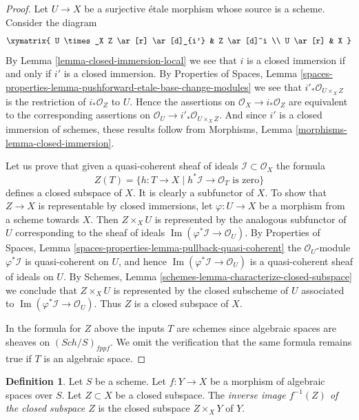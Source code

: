 \documentclass{stacks-project}
\theoremstyle{plain}
\theoremstyle{definition}
\newtheorem{definition}[subsection]{Definition}
\theoremstyle{remark}
\numberwithin{equation}{subsection}
\def\Sch{\mathit{Sch}}
\def\Im{\mathop{\mathrm{Im}}}
\begin{document}
\begin{proof}
Let $U \to X$ be a surjective \'etale morphism whose source is a scheme.
Consider the diagram
$$
\xymatrix{
U \times_X Z \ar[r] \ar[d]_{i'} & Z \ar[d]^i \\
U \ar[r] & X
}
$$
By
Lemma \ref{lemma-closed-immersion-local}
we see that $i$ is a closed immersion
if and only if $i'$ is a closed immersion. By
Properties of Spaces,
Lemma \ref{spaces-properties-lemma-pushforward-etale-base-change-modules}
we see that $i'_*\mathcal{O}_{U \times_X Z}$ is the restriction of
$i_*\mathcal{O}_Z$ to $U$. Hence the assertions on
$\mathcal{O}_X \to i_*\mathcal{O}_Z$ are equivalent to the
corresponding assertions on
$\mathcal{O}_U \to i'_*\mathcal{O}_{U \times_X Z}$.
And since $i'$ is a closed immersion of schemes, these results follow from
Morphisms, Lemma \ref{morphisms-lemma-closed-immersion}.

\medskip\noindent
Let us prove that given a quasi-coherent
sheaf of ideals $\mathcal{I} \subset \mathcal{O}_X$ the formula
$$
Z(T) = \{h : T \to X \mid h^*\mathcal{I} \to \mathcal{O}_T
\text{ is zero}\}
$$
defines a closed subspace of $X$. It is clearly a subfunctor of $X$.
To show that $Z \to X$ is representable by closed immersions, let
$\varphi : U \to X$ be a morphism from a scheme towards $X$. Then
$Z \times_X U$ is represented by the analogous subfunctor of $U$ corresponding
to the sheaf of ideals $\Im(\varphi^*\mathcal{I} \to \mathcal{O}_U)$. By
Properties of Spaces,
Lemma \ref{spaces-properties-lemma-pullback-quasi-coherent}
the $\mathcal{O}_U$-module $\varphi^*\mathcal{I}$ is quasi-coherent
on $U$, and hence $\Im(\varphi^*\mathcal{I} \to \mathcal{O}_U)$
is a quasi-coherent sheaf of ideals on $U$. By
Schemes, Lemma \ref{schemes-lemma-characterize-closed-subspace}
we conclude that $Z \times_X U$ is represented by the closed subscheme
of $U$ associated to $\Im(\varphi^*\mathcal{I} \to \mathcal{O}_U)$.
Thus $Z$ is a closed subspace of $X$.

\medskip\noindent
In the formula for $Z$ above the inputs $T$ are schemes since algebraic
spaces are sheaves on $(\Sch/S)_{fppf}$. We omit the verification
that the same formula remains true if $T$ is an algebraic space.
\end{proof}

\begin{definition}
\label{definition-inverse-image-closed-subspace}
Let $S$ be a scheme. Let $f : Y \to X$ be a morphism of algebraic spaces
over $S$. Let $Z \subset X$ be a closed subspace. The
{\it inverse image $f^{-1}(Z)$ of the closed subspace $Z$}
is the closed subspace $Z \times_X Y$ of $Y$.
\end{definition}
\end{document}
